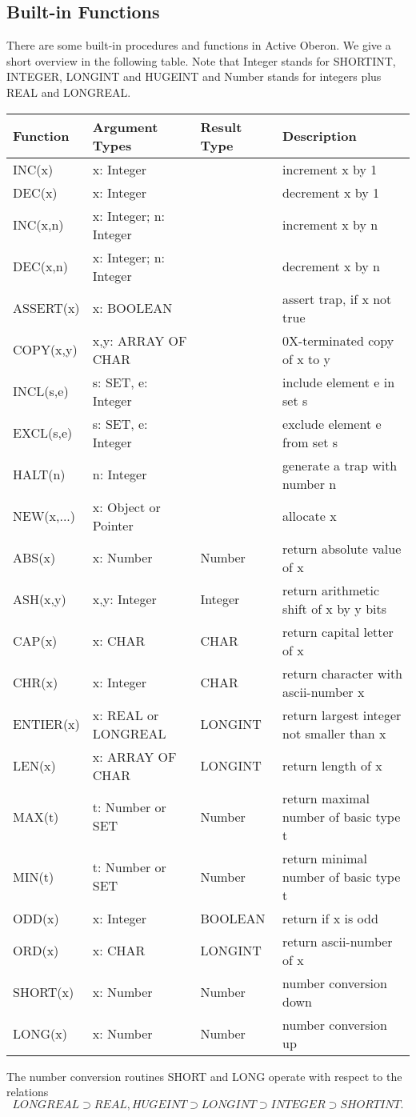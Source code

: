 \documentclass[a4paper,11pt]{article}
\begin{document}
\subsection{Built-in Functions}
There are some built-in procedures and functions in Active Oberon. We give a short overview in the following table. Note that Integer stands for SHORTINT, INTEGER, LONGINT and HUGEINT and Number stands for integers plus REAL and LONGREAL.
\begin{longtable}{|p{2cm}|p{4.3cm}|p{1.95cm}|p{6cm}|}
\hline
Function & Argument Types & Result Type & Description \\
\hline\hline
\endhead
INC(x) & x: Integer &  & increment x by 1 \\
DEC(x) & x: Integer &  & decrement x by 1 \\
INC(x,n) & x: Integer; n: Integer &  & increment x by n \\
DEC(x,n) & x: Integer; n: Integer &  & decrement x by n \\
ASSERT(x) & x: BOOLEAN & & assert trap, if x not true \\
COPY(x,y) & x,y: ARRAY OF CHAR& & 0X-terminated copy of x to y \\
INCL(s,e) & s: SET, e: Integer & & include element e in set s \\
EXCL(s,e) & s: SET, e: Integer & & exclude element e from set s \\
HALT(n) & n: Integer & & generate a trap with number n \\
NEW(x,...) & x: Object or Pointer & & allocate x\\
ABS(x) & x: Number & Number & return absolute value of x\\
ASH(x,y) & x,y: Integer & Integer & return arithmetic shift of x by y bits\\
CAP(x) & x: CHAR & CHAR & return capital letter of x\\
CHR(x) & x: Integer & CHAR & return character with ascii-number x\\
ENTIER(x) & x: REAL or LONGREAL & LONGINT & return largest integer not smaller than x\\
LEN(x) & x: ARRAY OF CHAR & LONGINT & return length of x\\
MAX(t) & t: Number or SET & Number & return maximal number of basic type t\\
MIN(t) & t: Number or SET & Number & return minimal number of basic type t\\
ODD(x) & x: Integer & BOOLEAN & return if x is odd\\
ORD(x) & x: CHAR & LONGINT & return ascii-number of x\\
SHORT(x) & x: Number & Number & number conversion down \\
LONG(x) & x: Number & Number & number conversion up \\
\hline
\end{longtable}
The number conversion routines SHORT and LONG operate with respect to the relations
$$LONGREAL \supset REAL, HUGEINT \supset LONGINT \supset INTEGER \supset SHORTINT.$$
\end{document}
